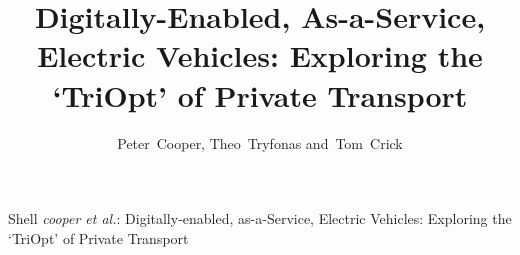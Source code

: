 \documentclass[journal]{IEEEtran}
\begin{document}
%
\title{Digitally-Enabled, As-a-Service, Electric Vehicles: Exploring the `TriOpt' of Private Transport}
%
%
%

\author{Peter~Cooper, Theo~Tryfonas and~Tom~Crick}%

% 
%



%
{Shell \MakeLowercase{\textit{Cooper et al.}}: Digitally-enabled,
  as-a-Service, Electric Vehicles: Exploring the `TriOpt' of Private
  Transport}
% 
\end{document}
